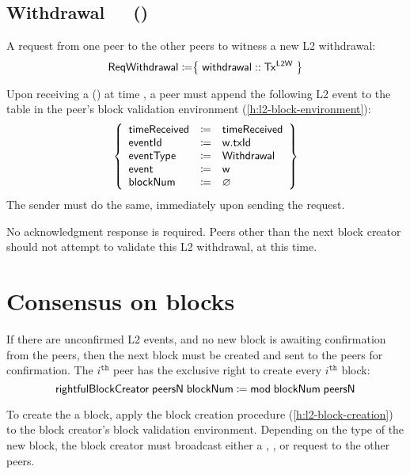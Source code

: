 \documentclass[../hydrozoa.tex]{subfiles}
\begin{document}
\subsection{Withdrawal~~~()}%
\label{h:l2-consensus-withdrawal}%

A request from one peer to the other peers to witness a new L2 withdrawal:
\begin{equation*}
  \mathsf{ReqWithdrawal} \coloneq \bigr\{\; \mathsf{withdrawal} :: \mathsf{Tx^{L2W}} \;\bigr\}
\end{equation*}

Upon receiving a () at time , a peer must append the following L2 event to the  table in the peer's block validation environment (\cref{h:l2-block-environment}):
\begin{equation*}
  \left\{
  \begin{array}{lll}
    \mathsf{timeReceived} &\coloneq& \mathsf{timeReceived} \\
    \mathsf{eventId} &\coloneq& \mathsf{w.txId} \\
    \mathsf{eventType} &\coloneq& \mathsf{Withdrawal} \\
    \mathsf{event} &\coloneq& \mathsf{w} \\
    \mathsf{blockNum} &\coloneq& \varnothing
  \end{array}\right\}
\end{equation*}
The sender must do the same, immediately upon sending the request.

No acknowledgment response is required.
Peers other than the next block creator should not attempt to validate this L2 withdrawal, at this time.

\section{Consensus on blocks}%
\label{h:l2-consensus-on-blocks}%

If there are unconfirmed L2 events, and no new block is awaiting confirmation from the peers, then the next block must be created and sent to the peers for confirmation.
The $i^\mathtt{th}$ peer has the exclusive right to create every $i^\mathtt{th}$ block: 
\begin{equation*}
  \mathsf{rightfulBlockCreator} \; \mathsf{peersN} \; \mathsf{blockNum} \coloneq
    \mathsf{mod} \; \mathsf{blockNum} \; \mathsf{peersN}
\end{equation*}

To create the a block, apply the block creation procedure (\cref{h:l2-block-creation}) to the block creator's block validation environment.
Depending on the type of the new block, the block creator must broadcast either a , , or  request to the other peers.
\end{document}
